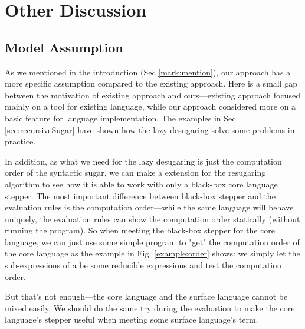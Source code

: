\section{Other Discussion}
\label{sec5}

\subsection{Model Assumption}
\label{sec5.1}


As we mentioned in the introduction (Sec \ref{mark:mention}), our approach has a more specific assumption compared to the existing approach. Here is a small gap between the motivation of existing approach and ours---existing approach focused mainly on a tool for existing language, while our approach considered more on a basic feature for language implementation. The examples in Sec \ref{sec:recursiveSugar} have shown how the lazy desugaring solve some problems in practice.

In addition, as what we need for the lazy desugaring is just the computation order of the syntactic sugar, we can make a extension for the resugaring algorithm to see how it is able to work with only a black-box core language stepper. The most important difference between black-box stepper and the evaluation rules is the computation order---while the same language will behave uniquely, the evaluation rules can show the computation order statically (without running the program). So when meeting the black-box stepper for the core language, we can just use some simple program to "get" the computation order of the core language as the  example in Fig. \ref{example:order} shows: we simply let the sub-expressions of a  be some reducible expressions and test the computation order.



But that's not enough---the core language and the surface language cannot be mixed easily. We should do the same try during the evaluation to make the core language's stepper useful when meeting some surface language's term.

